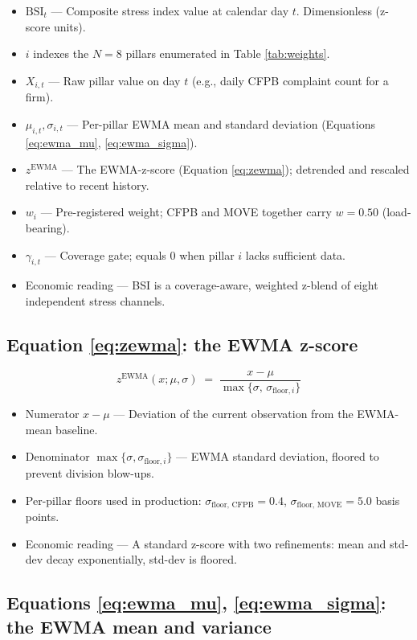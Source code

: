 \documentclass[11pt,a4paper]{article}
\begin{document}
\begin{itemize}[leftmargin=*]
\item $\text{BSI}_t$ --- Composite stress index value at calendar day $t$. Dimensionless (z-score units).
\item $i$ indexes the $N = 8$ pillars enumerated in Table \ref{tab:weights}.
\item $X_{i,t}$ --- Raw pillar value on day $t$ (e.g., daily CFPB complaint count for a firm).
\item $\mu_{i,t}, \sigma_{i,t}$ --- Per-pillar EWMA mean and standard deviation (Equations \ref{eq:ewma_mu}, \ref{eq:ewma_sigma}).
\item $z^{\text{EWMA}}$ --- The EWMA-z-score (Equation \ref{eq:zewma}); detrended and rescaled relative to recent history.
\item $w_i$ --- Pre-registered weight; CFPB and MOVE together carry $w = 0.50$ (load-bearing).
\item $\gamma_{i,t}$ --- Coverage gate; equals $0$ when pillar $i$ lacks sufficient data.
\item Economic reading --- BSI is a coverage-aware, weighted z-blend of eight independent stress channels.
\end{itemize}

\subsection*{Equation \ref{eq:zewma}: the EWMA z-score}

\[
z^{\text{EWMA}}(x;\mu,\sigma) \;=\; \frac{x - \mu}{\max\{\sigma,\,\sigma_{\text{floor},i}\}}
\]

\begin{itemize}[leftmargin=*]
\item Numerator $x - \mu$ --- Deviation of the current observation from the EWMA-mean baseline.
\item Denominator $\max\{\sigma, \sigma_{\text{floor}, i}\}$ --- EWMA standard deviation, floored to prevent division blow-ups.
\item Per-pillar floors used in production: $\sigma_{\text{floor, CFPB}} = 0.4$, $\sigma_{\text{floor, MOVE}} = 5.0$ basis points.
\item Economic reading --- A standard z-score with two refinements: mean and std-dev decay exponentially, std-dev is floored.
\end{itemize}

\subsection*{Equations \ref{eq:ewma_mu}, \ref{eq:ewma_sigma}: the EWMA mean and variance}
\end{document}
